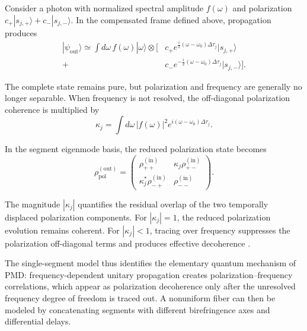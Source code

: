 Consider a photon with normalized spectral amplitude \(f(\omega)\) and
polarization
\(c_+|s_{j,+}\rangle+c_-|s_{j,-}\rangle\).
In the compensated frame defined above, propagation produces
%
\begin{align}
    |\psi_{\mathrm{out}}\rangle
    \simeq
    \int d\omega\,
    f(\omega)|\omega\rangle
    \otimes
    \Big[
        &
        c_+
        e^{\frac{i}{2}(\omega-\omega_0)\Delta\tau_j}
        |s_{j,+}\rangle
        \nonumber\\
        {}+
        &
        c_-
        e^{-\frac{i}{2}(\omega-\omega_0)\Delta\tau_j}
        |s_{j,-}\rangle
    \Big].
    \label{eq:single_segment_output_wave_packet}
\end{align}

The complete state remains pure, but polarization and frequency are generally
no longer separable. When frequency is not resolved, the off-diagonal
polarization coherence is multiplied by
%
\begin{equation}
    \kappa_j
    =
    \int d\omega\,
    |f(\omega)|^2
    e^{i(\omega-\omega_0)\Delta\tau_j}.
    \label{eq:single_segment_coherence_factor}
\end{equation}

In the segment eigenmode basis, the reduced polarization state becomes
%
\begin{equation}
    \rho_{\mathrm{pol}}^{(\mathrm{out})}
    =
    \begin{pmatrix}
        \rho_{++}^{(\mathrm{in})}
        &
        \kappa_j\rho_{+-}^{(\mathrm{in})}
        \\
        \kappa_j^*\rho_{-+}^{(\mathrm{in})}
        &
        \rho_{--}^{(\mathrm{in})}
    \end{pmatrix}.
    \label{eq:single_segment_reduced_polarization_state}
\end{equation}

The magnitude \(|\kappa_j|\) quantifies the residual overlap of the two
temporally displaced polarization components. For
\(|\kappa_j|=1\), the reduced polarization evolution remains coherent. For
\(|\kappa_j|<1\), tracing over frequency suppresses the polarization
off-diagonal terms and produces effective decoherence
\cite{poon_law_stochastic_pmd_2008}.

The single-segment model thus identifies the elementary quantum mechanism of
PMD: frequency-dependent unitary propagation creates
polarization--frequency correlations, which appear as polarization
decoherence only after the unresolved frequency degree of freedom is traced
out. A nonuniform fiber can then be modeled by concatenating segments with
different birefringence axes and differential delays.

